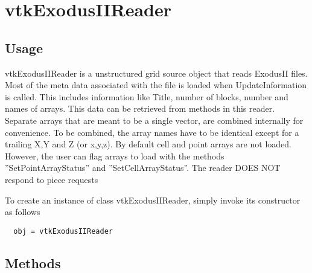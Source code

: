 \section{vtkExodusIIReader}

\subsection{Usage}

 vtkExodusIIReader is a unstructured grid source object that reads ExodusII
 files.  Most of the meta data associated with the file is loaded when 
 UpdateInformation is called.  This includes information like Title, number
 of blocks, number and names of arrays. This data can be retrieved from 
 methods in this reader. Separate arrays that are meant to be a single 
 vector, are combined internally for convenience.  To be combined, the array 
 names have to be identical except for a trailing X,Y and Z (or x,y,z).  By 
 default cell and point arrays are not loaded.  However, the user can flag 
 arrays to load with the methods ''SetPointArrayStatus'' and
 ''SetCellArrayStatus''.  The reader DOES NOT respond to piece requests
 

To create an instance of class vtkExodusIIReader, simply
invoke its constructor as follows
\begin{verbatim}
  obj = vtkExodusIIReader
\end{verbatim}
\subsection{Methods}

